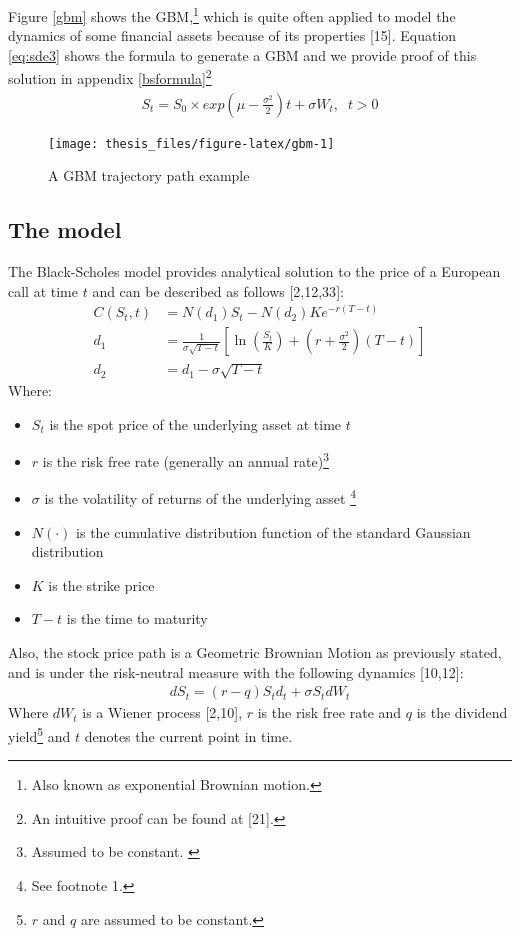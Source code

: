 \documentclass[12pt,twoside]{reedthesis}
\providecommand{\tightlist}{%
  \setlength{\itemsep}{0pt}\setlength{\parskip}{0pt}}
\theoremstyle{definition}
\theoremstyle{definition}
\theoremstyle{remark}
\begin{document}
  Figure \ref{gbm} shows the GBM,\footnote{Also known as exponential
    Brownian motion.} which is quite often applied to model the dynamics
  of some financial assets because of its properties {[}15{]}. Equation
  \eqref{eq:sde3} shows the formula to generate a GBM and we provide proof
  of this solution in appendix \ref{bsformula}\footnote{An intuitive proof
    can be found at {[}21{]}.}
  \begin{align} \label{eq:sde3}
  S_t = S_0 \times exp{\left(\mu - \frac{\sigma^2}{2} \right) t + \sigma W_t}, \;\; t > 0
  \end{align}
  \begin{figure}
  
  {\centering \texttt{[image: thesis\_files/figure-latex/gbm-1]} 
  
  }
  
  \caption{A GBM trajectory path example \label{gbm}}\label{fig:gbm}
  \end{figure}
  \subsection{The model}\label{the-model}
  
  The Black-Scholes model provides analytical solution to the price of a
  European call at time \(t\) and can be described as follows
  {[}2,12,33{]}:
  \begin{align}
  C(S_{t},t)&=N(d_{1})S_{t}-N(d_{2})Ke^{-r(T-t)}\\[10pt]
  d_{1}&={\frac {1}{\sigma {\sqrt {T-t}}}}\left[\ln \left({\frac {S_{t}}{K}}\right)+\left(r+{\frac {\sigma ^{2}}{2}}\right)(T-t)\right]\\[10pt]
  d_{2}&=d_{1}-\sigma {\sqrt {T-t}}
  \end{align}
  \noindent
  Where:
  \begin{itemize}
  \tightlist
  \item
    \(S_{t}\) is the spot price of the underlying asset at time \(t\)
  \item
    \(r\) is the risk free rate (generally an annual
    rate)\footnote{Assumed to be constant. \label{teste}}
  \item
    \(\sigma\) is the volatility of returns of the underlying asset
    \footnote{See footnote 1.}
  \item
    \(N(\cdot )\) is the cumulative distribution function of the standard
    Gaussian distribution
  \item
    \(K\) is the strike price
  \item
    \(T-t\) is the time to maturity
  \end{itemize}
  \noindent
  Also, the stock price path is a Geometric Brownian Motion as previously
  stated, and is under the risk-neutral measure with the following
  dynamics {[}10,12{]}:
  \begin{align}
  dS_{t} = (r-q)S_td_t+\sigma S_t dW_t
  \end{align}
  \noindent
  Where \(dW_t\) is a Wiener process {[}2,10{]}, \(r\) is the risk free
  rate and \(q\) is the dividend
  yield\footnote{$r$ and $q$ are assumed to be constant.} and \(t\)
  denotes the current point in time.
  
\end{document}
